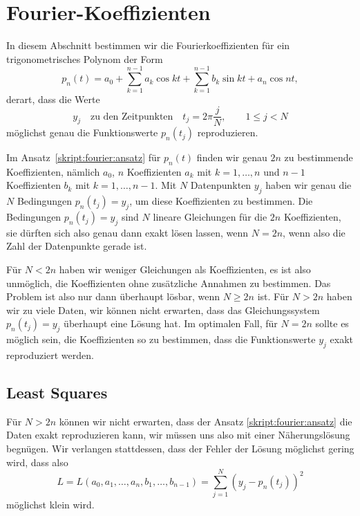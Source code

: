 %
%
%
\section{Fourier-Koeffizienten}
In diesem Abschnitt bestimmen wir die Fourierkoeffizienten für ein
trigonometrisches Polynom der Form
\begin{equation}
p_n(t)
=
a_0 + \sum_{k=1}^{n-1} a_k\cos kt + \sum_{k=1}^{n-1} b_k\sin kt + a_n\cos nt,
\label{skript:fourier:ansatz}
\end{equation}
derart, dass die Werte
\begin{equation}
y_j \quad\text{zu den Zeitpunkten}\quad t_j=2\pi\frac{j}{N},\qquad 1\le j< N
\label{skript:fourier:gleichungen}
\end{equation}
möglichst genau die Funktionswerte $p_n(t_j)$ reproduzieren.

Im Ansatz~\eqref{skript:fourier:ansatz} für $p_n(t)$ finden wir
genau $2n$ zu bestimmende Koeffizienten, nämlich $a_0$,
$n$ Koeffizienten $a_k$ mit $k=1,\dots,n$
und $n-1$ Koeffizienten $b_k$ mit $k=1,\dots,n-1$.
Mit $N$ Datenpunkten $y_j$ haben wir genau die $N$ Bedingungen
$p_n(t_j)=y_j$, um diese Koeffizienten zu bestimmen.
Die Bedingungen $p_n(t_j)=y_j$ sind $N$ lineare Gleichungen für die
$2n$ Koeffizienten, sie dürften sich also genau dann exakt lösen
lassen, wenn $N=2n$, wenn also die Zahl der Datenpunkte gerade ist.

Für $N<2n$ haben wir weniger Gleichungen als Koeffizienten, es ist
also unmöglich, die Koeffizienten ohne zusätzliche Annahmen zu bestimmen.
Das Problem ist also nur dann überhaupt lösbar, wenn $N\ge 2n$ ist.
Für $N>2n$ haben wir zu viele Daten, wir können nicht erwarten, dass
das Gleichungssystem $p_n(t_j)=y_j$ überhaupt eine Lösung hat.
Im optimalen Fall, für $N=2n$ sollte es möglich sein, die Koeffizienten so
zu bestimmen, dass die Funktionswerte $y_j$ exakt reproduziert werden.

\subsection{Least Squares}
Für $N>2n$ können wir nicht erwarten, dass der Ansatz
\eqref{skript:fourier:ansatz} die Daten exakt reproduzieren kann,
wir müssen uns also mit einer Näherungslösung begnügen.
Wir verlangen stattdessen, dass der Fehler der Lösung möglichst gering
wird, dass also
\[
L=L(a_0,a_1,\dots,a_n,b_1,\dots,b_{n-1})= \sum_{j=1}^N (y_j - p_n(t_j))^2
\]
möglichst klein wird.

